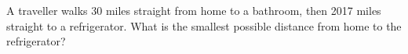A traveller walks 30 miles straight from home to a bathroom, then 2017 miles straight to a refrigerator. What is the smallest possible distance from home to the refrigerator?
